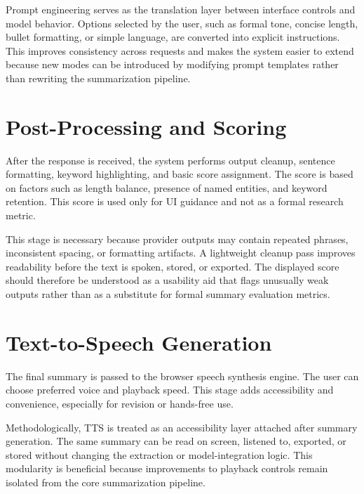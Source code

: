 \documentclass[12pt, a4paper]{report}
\begin{document}
Prompt engineering serves as the translation layer between interface controls and model behavior. Options selected by the user, such as formal tone, concise length, bullet formatting, or simple language, are converted into explicit instructions. This improves consistency across requests and makes the system easier to extend because new modes can be introduced by modifying prompt templates rather than rewriting the summarization pipeline.

\section{Post-Processing and Scoring}
After the response is received, the system performs output cleanup, sentence formatting, keyword highlighting, and basic score assignment. The score is based on factors such as length balance, presence of named entities, and keyword retention. This score is used only for UI guidance and not as a formal research metric.

This stage is necessary because provider outputs may contain repeated phrases, inconsistent spacing, or formatting artifacts. A lightweight cleanup pass improves readability before the text is spoken, stored, or exported. The displayed score should therefore be understood as a usability aid that flags unusually weak outputs rather than as a substitute for formal summary evaluation metrics.

\section{Text-to-Speech Generation}
The final summary is passed to the browser speech synthesis engine. The user can choose preferred voice and playback speed. This stage adds accessibility and convenience, especially for revision or hands-free use.

Methodologically, TTS is treated as an accessibility layer attached after summary generation. The same summary can be read on screen, listened to, exported, or stored without changing the extraction or model-integration logic. This modularity is beneficial because improvements to playback controls remain isolated from the core summarization pipeline.



\end{document}
